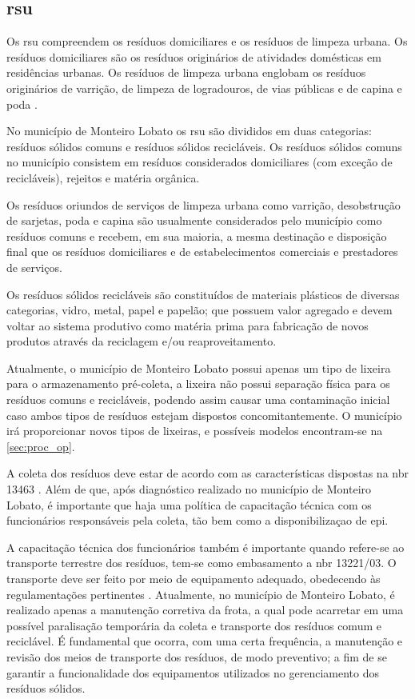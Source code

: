 	\subsection{\gls{rsu}}
	Os \gls{rsu} compreendem os resíduos domiciliares e os resíduos de limpeza urbana. Os resíduos domiciliares são os resíduos originários de atividades domésticas em residências urbanas. Os resíduos de limpeza urbana englobam os resíduos originários de varrição, de limpeza de logradouros, de vias públicas e de capina e poda \cite{brasil:12305, brasil:11445}.
	
	No município de Monteiro Lobato os \gls{rsu} são divididos em duas categorias: resíduos sólidos comuns e resíduos sólidos recicláveis. Os resíduos sólidos comuns no município consistem em resíduos considerados domiciliares (com exceção de recicláveis), rejeitos e matéria orgânica.
	
	Os resíduos oriundos de serviços de limpeza urbana como varrição, desobstrução de sarjetas, poda e capina são usualmente considerados pelo município como resíduos comuns e recebem, em sua maioria, a mesma destinação e disposição final que os resíduos domiciliares e de estabelecimentos comerciais e prestadores de serviços.
	
	Os resíduos sólidos recicláveis são constituídos de materiais plásticos de diversas categorias, vidro, metal, papel e papelão; que possuem valor agregado e devem voltar ao sistema produtivo como matéria prima para fabricação de novos produtos através da reciclagem e/ou reaproveitamento.
	
	Atualmente, o município de Monteiro Lobato possui apenas um tipo de lixeira para o armazenamento pré-coleta, a lixeira não possui separação física para os resíduos comuns e recicláveis, podendo assim causar uma contaminação inicial caso ambos tipos de resíduos estejam dispostos concomitantemente. O município irá proporcionar novos tipos de lixeiras, e possíveis modelos encontram-se na \autoref{sec:proc_op}. %
	
	A coleta dos resíduos deve estar de acordo com as características dispostas na \gls{nbr} 13463 \cite{abnt:13463:1995}. Além de que, após diagnóstico realizado no município de Monteiro Lobato, é importante que haja uma política de capacitação técnica com os funcionários responsáveis pela coleta, tão bem como a disponibilizaçao de \gls{epi}. 
	
	A capacitação técnica dos funcionários também é importante quando refere-se ao transporte terrestre dos resíduos, tem-se como embasamento a \gls{nbr} 13221/03. O transporte deve ser feito por meio de equipamento adequado, obedecendo às regulamentações pertinentes \cite{abnt:13221:2003}. Atualmente, no município de Monteiro Lobato, é realizado apenas a manutenção corretiva da frota, a qual pode acarretar em uma possível paralisação temporária da coleta e transporte dos resíduos comum e reciclável. É fundamental que ocorra, com uma certa frequência, a manutenção e revisão dos meios de transporte dos resíduos, de modo preventivo; a fim de se garantir a funcionalidade dos equipamentos utilizados no gerenciamento dos resíduos sólidos.
	
